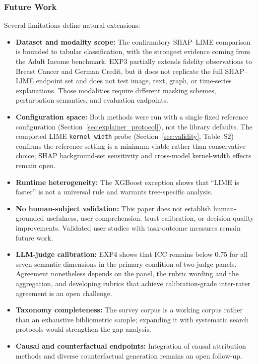 \documentclass[10pt,a4paper,twoside]{article}
\begin{document}
\subsubsection{Future Work}

Several limitations define natural extensions:
\begin{itemize}[leftmargin=*]
\item \textbf{Dataset and modality scope:} The confirmatory SHAP--LIME
comparison is bounded to tabular classification, with the strongest
evidence coming from the Adult Income benchmark. EXP3 partially extends
fidelity observations to Breast Cancer and German Credit, but it does not
replicate the full SHAP--LIME endpoint set and does not test image, text,
graph, or time-series explanations. Those modalities require different
masking schemes, perturbation semantics, and evaluation endpoints.
\item \textbf{Configuration space:} Both methods were run with a single
fixed reference configuration (Section~\ref{sec:explainer_protocol}), not
the library defaults. The completed LIME \texttt{kernel\_width} probe
(Section~\ref{sec:validity}, Table~S2) confirms the
reference setting is a minimum-viable rather than conservative choice;
SHAP background-set sensitivity and cross-model kernel-width effects
remain open.
\item \textbf{Runtime heterogeneity:} The XGBoost exception shows that
``LIME is faster'' is not a universal rule and warrants tree-specific analysis.
\item \textbf{No human-subject validation:} This paper does not establish
human-grounded usefulness, user comprehension, trust calibration, or
decision-quality improvements. Validated user studies with task-outcome
measures remain future work.
\item \textbf{LLM-judge calibration:} EXP4 shows that ICC remains below
0.75 for all seven semantic dimensions in the primary condition of two judge
panels. Agreement nonetheless depends on the panel, the rubric wording and the
aggregation, and developing rubrics that achieve calibration-grade inter-rater
agreement is an open challenge.
\item \textbf{Taxonomy completeness:} The survey corpus is a working
corpus rather than an exhaustive bibliometric sample; expanding it with
systematic search protocols would strengthen the gap analysis.
\item \textbf{Causal and counterfactual endpoints:} Integration of
causal attribution methods and diverse counterfactual generation
\citep{mothilal2020dice} remains an open follow-up.
\end{itemize}
\end{document}
